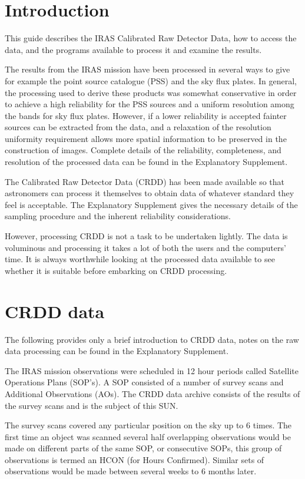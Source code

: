 \section {Introduction}

This guide describes the IRAS Calibrated Raw Detector Data, how to access the
data, and the programs available to process it and examine the results.

The results from the IRAS mission have been processed in several ways to give
for example the point source catalogue (PSS) and the sky flux plates. In 
general, the processing used to derive these products was somewhat conservative
in order to achieve a high reliability for the PSS sources and a uniform
resolution among the bands for sky flux plates. However, if a lower reliability
is accepted fainter sources can be extracted from the data, and a relaxation of
the resolution uniformity requirement allows more spatial information to be
preserved in the construction of images.
Complete details of the reliability, completeness, and resolution of the
processed data can be found in the Explanatory Supplement.

The Calibrated Raw Detector Data (CRDD) has been made available so that
astronomers can process it themselves to obtain data of whatever standard
they feel is acceptable. The Explanatory Supplement gives the necessary details
of the sampling procedure and the inherent reliability considerations.

However, processing CRDD is not a task to be undertaken lightly. The data is
voluminous and processing it takes a lot of both the users and the computers'
time. It is always worthwhile looking at the processed data available to see 
whether it is suitable before embarking on CRDD processing.

\section{CRDD data}

The following provides only a brief introduction to CRDD data, notes on the raw
data processing can be found in the Explanatory Supplement.

The IRAS mission observations were scheduled in 12 hour periods called 
Satellite Operations Plans (SOP's). A SOP consisted of a number of survey scans
and Additional Observations (AOs). The CRDD data archive consists of the 
results of the survey scans and is the subject of this SUN.

The survey scans covered any particular position on the sky up to 6 times. The
first time an object was scanned several half overlapping observations would be
made on different parts of the same SOP, or consecutive SOPs, this group of
observations is termed an HCON (for Hours Confirmed). Similar sets of
observations would be made between several weeks to 6 months later.

